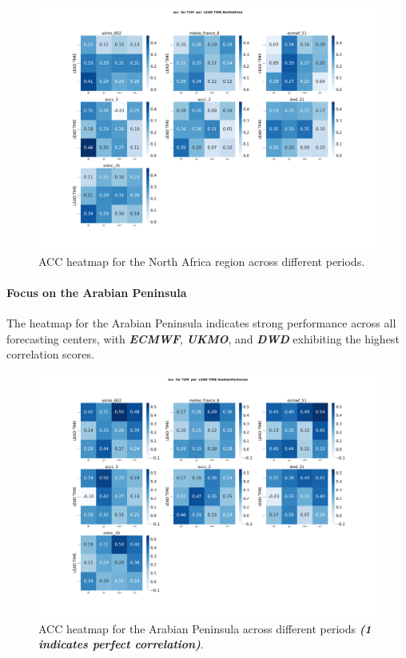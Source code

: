 \begin{figure}[H]
\centering
\includegraphics[scale=0.25]{plots/det/acc/acc_T2M_NorthAfrica.png}
\caption{ACC heatmap for the North Africa region across different periods.}
\end{figure}

\paragraph{Focus on the Arabian Peninsula}  
The heatmap for the Arabian Peninsula indicates strong performance across all forecasting centers, with \textbf{\textit{ECMWF}}, \textbf{\textit{UKMO}}, and \textbf{\textit{DWD}} exhibiting the highest correlation scores.  

\begin{figure}[H]
\centering
\includegraphics[scale=0.25]{plots/det/acc/acc_T2M_ArabianPeninsula.png}
\caption{ACC heatmap for the Arabian Peninsula across different periods \textbf{\textit{(1 indicates perfect correlation)}}.}
\end{figure}

